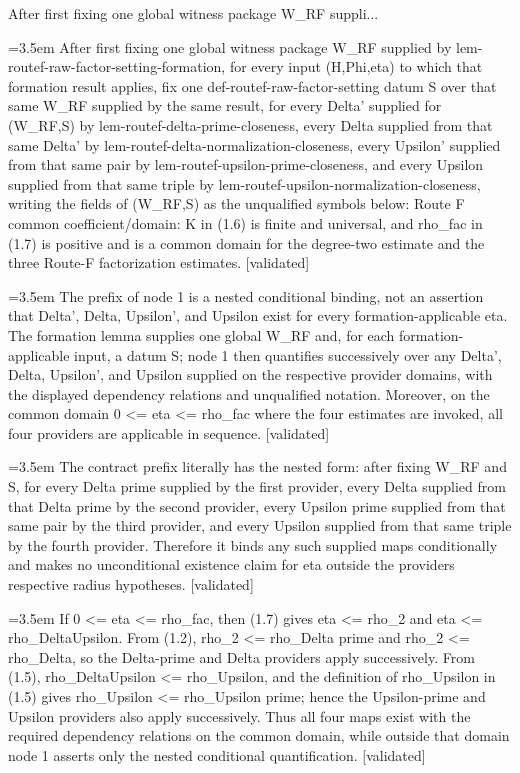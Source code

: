 \documentclass{article}
\newcommand{\step}[1]{\par\noindent\hangindent=3.5em\hangafter=1%
  \makebox[3.5em][l]{\textbf{#1.}}}
\newcommand{\steptag}[1]{\hfill{\small\textsf{[#1]}}}
\begin{document}
\begin{proofbox}{After first fixing one global witness package W\_RF suppli...}
\step{1} After first fixing one global witness package W\_RF supplied by lem-routef-raw-factor-setting-formation, for every input (H,Phi,eta) to which that formation result applies, fix one def-routef-raw-factor-setting datum S over that same W\_RF supplied by the same result, for every Delta' supplied for (W\_RF,S) by lem-routef-delta-prime-closeness, every Delta supplied from that same Delta' by lem-routef-delta-normalization-closeness, every Upsilon' supplied from that same pair by lem-routef-upsilon-prime-closeness, and every Upsilon supplied from that same triple by lem-routef-upsilon-normalization-closeness, writing the fields of (W\_RF,S) as the unqualified symbols below: Route F common coefficient/domain: K in (1.6) is finite and universal, and rho\_fac in (1.7) is positive and is a common domain for the degree-two estimate and the three Route-F factorization estimates. \steptag{validated} \\[6pt]
\step{1.1} The prefix of node 1 is a nested conditional binding, not an assertion that Delta', Delta, Upsilon', and Upsilon exist for every formation-applicable eta. The formation lemma supplies one global W\_RF and, for each formation-applicable input, a datum S; node 1 then quantifies successively over any Delta', Delta, Upsilon', and Upsilon supplied on the respective provider domains, with the displayed dependency relations and unqualified notation. Moreover, on the common domain 0 <= eta <= rho\_fac where the four estimates are invoked, all four providers are applicable in sequence. \steptag{validated} \\[6pt]
\step{1.1.1} The contract prefix literally has the nested form: after fixing W\_RF and S, for every Delta prime supplied by the first provider, every Delta supplied from that Delta prime by the second provider, every Upsilon prime supplied from that same pair by the third provider, and every Upsilon supplied from that same triple by the fourth provider. Therefore it binds any such supplied maps conditionally and makes no unconditional existence claim for eta outside the providers respective radius hypotheses. \steptag{validated} \\[4pt]
\step{1.1.2} If 0 <= eta <= rho\_fac, then (1.7) gives eta <= rho\_2 and eta <= rho\_DeltaUpsilon. From (1.2), rho\_2 <= rho\_Delta prime and rho\_2 <= rho\_Delta, so the Delta-prime and Delta providers apply successively. From (1.5), rho\_DeltaUpsilon <= rho\_Upsilon, and the definition of rho\_Upsilon in (1.5) gives rho\_Upsilon <= rho\_Upsilon prime; hence the Upsilon-prime and Upsilon providers also apply successively. Thus all four maps exist with the required dependency relations on the common domain, while outside that domain node 1 asserts only the nested conditional quantification. \steptag{validated} \\[4pt]

\end{proofbox}
\end{document}

